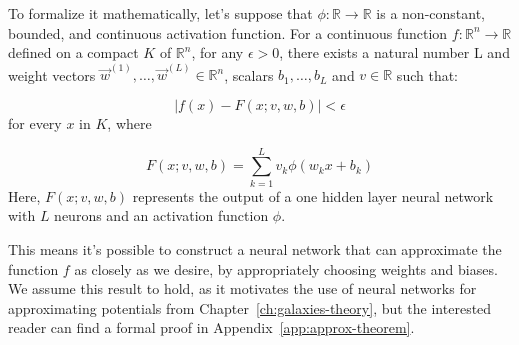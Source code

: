 To formalize it mathematically, let's suppose that $\phi : \mathbb{R} \rightarrow \mathbb{R}$ is a non-constant, bounded, and continuous activation function. For a continuous function $f : \mathbb{R}^n \rightarrow \mathbb{R}$ defined on a compact $K$ of $\mathbb{R}^n$, for any $\epsilon > 0$, there exists a natural number L and weight vectors $\Vec{w}^{(1)}, \dots, \Vec{w}^{(L)} \in \mathbb{R}^n$, scalars $b_1, \dots, b_L$ and $v \in \mathbb{R}$ such that:

\begin{equation}
| f(x) - F(x; v, w, b) | < \epsilon
\end{equation}
for every $x$ in $K$, where

\begin{equation}
F(x; v, w, b) = \sum_{k=1}^{L} v_k \phi(w_{k} x + b_k)
\end{equation}
Here, $F(x; v, w, b)$ represents the output of a one hidden layer neural network with $L$ neurons and an activation function $\phi$.

This means it's possible to construct a neural network that can approximate the function $f$ as closely as we desire, by appropriately choosing weights and biases. We assume this result to hold, as it motivates the use of neural networks for approximating potentials from Chapter~\ref{ch:galaxies-theory}, but the interested reader can find a formal proof in Appendix~\ref{app:approx-theorem}.